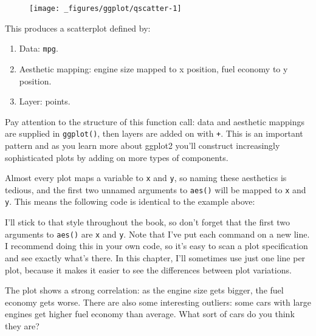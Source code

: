 \begin{figure}[H]
  \centering
  \texttt{[image: \_figures/ggplot/qscatter-1]}
\end{figure}

This produces a scatterplot defined by:

\begin{enumerate}
\def\labelenumi{\arabic{enumi}.}
\tightlist
\item
  Data: \texttt{mpg}.
\item
  Aesthetic mapping: engine size mapped to x position, fuel economy to y
  position.
\item
  Layer: points.
\end{enumerate}

Pay attention to the structure of this function call: data and aesthetic
mappings are supplied in \texttt{ggplot()}, then layers are added on
with \texttt{+}. This is an important pattern and as you learn more
about ggplot2 you'll construct increasingly sophisticated plots by
adding on more types of components.

Almost every plot maps a variable to \texttt{x} and \texttt{y}, so
naming these aesthetics is tedious, and the first two unnamed arguments
to \texttt{aes()} will be mapped to \texttt{x} and \texttt{y}. This
means the following code is identical to the example above:

\begin{Shaded}
\begin{Highlighting}[]
\StringTok{  }\NormalTok{()}
\end{Highlighting}
\end{Shaded}

I'll stick to that style throughout the book, so don't forget that the
first two arguments to \texttt{aes()} are \texttt{x} and \texttt{y}.
Note that I've put each command on a new line. I recommend doing this in
your own code, so it's easy to scan a plot specification and see exactly
what's there. In this chapter, I'll sometimes use just one line per
plot, because it makes it easier to see the differences between plot
variations.

The plot shows a strong correlation: as the engine size gets bigger, the
fuel economy gets worse. There are also some interesting outliers: some
cars with large engines get higher fuel economy than average. What sort
of cars do you think they are?

